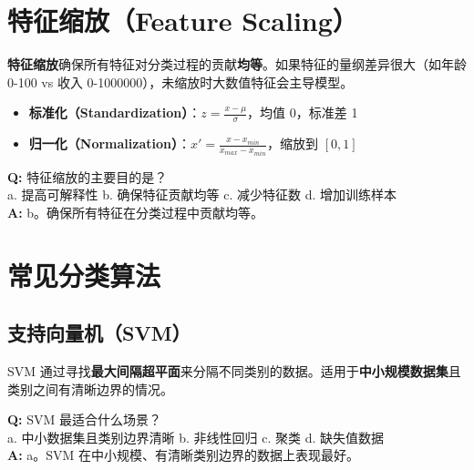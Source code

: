 \documentclass[11pt,a4paper]{article}
\begin{document}
\section{特征缩放（Feature Scaling）}

\begin{bluebox}[为什么需要特征缩放]
\textbf{特征缩放}确保所有特征对分类过程的贡献\textbf{均等}。如果特征的量纲差异很大（如年龄 0-100 vs 收入 0-1000000），未缩放时大数值特征会主导模型。
\end{bluebox}

\begin{orangebox}[常见缩放方法]
\begin{itemize}
    \item \textbf{标准化（Standardization）}：$z = \frac{x - \mu}{\sigma}$，均值 0，标准差 1
    \item \textbf{归一化（Normalization）}：$x' = \frac{x - x_{min}}{x_{max} - x_{min}}$，缩放到 $[0, 1]$
\end{itemize}
\end{orangebox}

\begin{examplebox}[例题：特征缩放的目的]
\textbf{Q:} 特征缩放的主要目的是？\\
a. 提高可解释性 \quad b. 确保特征贡献均等 \quad c. 减少特征数 \quad d. 增加训练样本\\
\textbf{A:} b。确保所有特征在分类过程中贡献均等。
\end{examplebox}

\section{常见分类算法}

\subsection{支持向量机（SVM）}

\begin{bluebox}
SVM 通过寻找\textbf{最大间隔超平面}来分隔不同类别的数据。适用于\textbf{中小规模数据集}且类别之间有清晰边界的情况。
\end{bluebox}

\begin{examplebox}
\textbf{Q:} SVM 最适合什么场景？\\
a. 中小数据集且类别边界清晰 \quad b. 非线性回归 \quad c. 聚类 \quad d. 缺失值数据\\
\textbf{A:} a。SVM 在中小规模、有清晰类别边界的数据上表现最好。
\end{examplebox}
\end{document}
